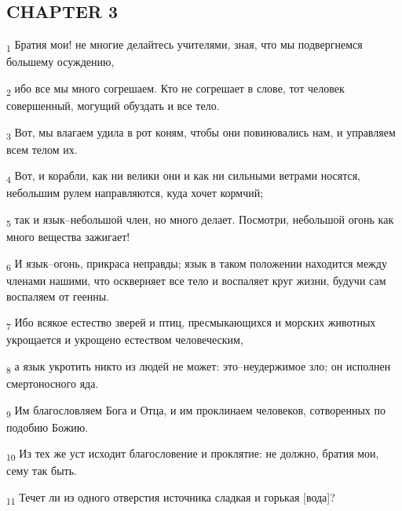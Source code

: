 \subsection{CHAPTER 3}
\begin{tcolorbox}
\textsubscript{1} Братия мои! не многие делайтесь учителями, зная, что мы подвергнемся большему осуждению,
\end{tcolorbox}
\begin{tcolorbox}
\textsubscript{2} ибо все мы много согрешаем. Кто не согрешает в слове, тот человек совершенный, могущий обуздать и все тело.
\end{tcolorbox}
\begin{tcolorbox}
\textsubscript{3} Вот, мы влагаем удила в рот коням, чтобы они повиновались нам, и управляем всем телом их.
\end{tcolorbox}
\begin{tcolorbox}
\textsubscript{4} Вот, и корабли, как ни велики они и как ни сильными ветрами носятся, небольшим рулем направляются, куда хочет кормчий;
\end{tcolorbox}
\begin{tcolorbox}
\textsubscript{5} так и язык--небольшой член, но много делает. Посмотри, небольшой огонь как много вещества зажигает!
\end{tcolorbox}
\begin{tcolorbox}
\textsubscript{6} И язык--огонь, прикраса неправды; язык в таком положении находится между членами нашими, что оскверняет все тело и воспаляет круг жизни, будучи сам воспаляем от геенны.
\end{tcolorbox}
\begin{tcolorbox}
\textsubscript{7} Ибо всякое естество зверей и птиц, пресмыкающихся и морских животных укрощается и укрощено естеством человеческим,
\end{tcolorbox}
\begin{tcolorbox}
\textsubscript{8} а язык укротить никто из людей не может: это--неудержимое зло; он исполнен смертоносного яда.
\end{tcolorbox}
\begin{tcolorbox}
\textsubscript{9} Им благословляем Бога и Отца, и им проклинаем человеков, сотворенных по подобию Божию.
\end{tcolorbox}
\begin{tcolorbox}
\textsubscript{10} Из тех же уст исходит благословение и проклятие: не должно, братия мои, сему так быть.
\end{tcolorbox}
\begin{tcolorbox}
\textsubscript{11} Течет ли из одного отверстия источника сладкая и горькая [вода]?
\end{tcolorbox}
